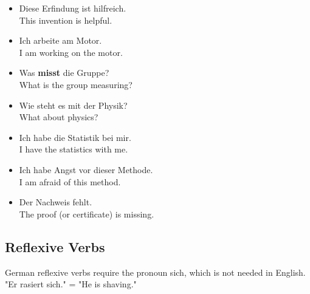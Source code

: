 \begin{itemize}
  \item  Diese Erfindung ist hilfreich. \\
  This invention is helpful.
  \item  Ich arbeite am Motor. \\
  I am working on the motor.
  \item  Was \textbf{misst} die Gruppe? \\
  What is the group measuring?
  \item  Wie steht es mit der Physik? \\
  What about physics?
  \item  Ich habe die Statistik bei mir. \\
  I have the statistics with me.
  \item  Ich habe Angst vor dieser Methode. \\
  I am afraid of this method.
  \item  Der Nachweis fehlt. \\
  The proof (or certificate) is missing.
\end{itemize}


\pagebreak
\subsection{Reflexive Verbs}

German reflexive verbs require the pronoun sich, which is not needed in English. "Er rasiert sich." = "He is shaving."

